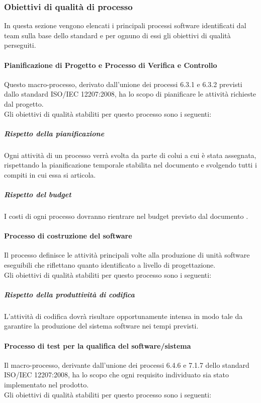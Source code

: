 		\subsubsection{Obiettivi di qualità di processo}
		In questa sezione vengono elencati i principali processi software identificati dal team sulla base dello standard  e per ognuno di essi gli obiettivi di qualità perseguiti.
			\paragraph{Pianificazione di Progetto e Processo di Verifica e Controllo }
			Questo macro-processo, derivato dall'unione dei processi 6.3.1 e 6.3.2 previsti dallo standard ISO/IEC 12207:2008, ha lo scopo di pianificare le attività richieste dal progetto.
\\Gli obiettivi di qualità stabiliti per questo processo sono i seguenti:

				\subparagraph{Rispetto della pianificazione}
				Ogni attività di un processo verrà svolta da parte di colui a cui è stata assegnata, rispettando la pianificazione temporale stabilita nel documento \PdP e svolgendo tutti i compiti in cui essa si articola.
				\subparagraph{Rispetto del budget}
				I costi di ogni processo dovranno rientrare nel budget previsto dal documento \PdP.
			\paragraph{Processo di costruzione del software}
			Il processo definisce le attività principali volte alla produzione di unità software eseguibili che riflettano quanto identificato a livello di progettazione.
\\Gli obiettivi di qualità stabiliti per questo processo sono i seguenti:

				\subparagraph{Rispetto della produttività di codifica}
				L'attività di codifica dovrà risultare opportunamente intensa in modo tale da garantire la produzione del sistema software nei tempi previsti.
			\paragraph{Processo di test per la qualifica del software/sistema}
			Il macro-processo, derivante dall'unione dei processi 6.4.6 e 7.1.7 dello standard ISO/IEC 12207:2008, ha lo scopo che ogni requisito individuato sia stato implementato nel prodotto.
\\Gli obiettivi di qualità stabiliti per questo processo sono i seguenti:

